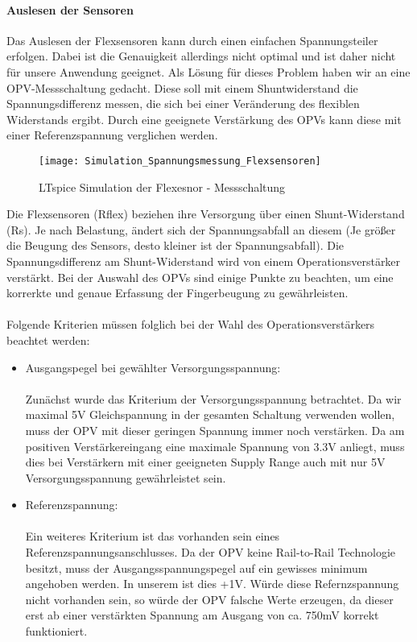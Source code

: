 \documentclass[titlepage,12pt,twoside]{article}
\begin{document}
\paragraph{Auslesen der Sensoren}
\label{par:Auslesen der Sensoren}
\hfill \break
\hfill \break
Das Auslesen der Flexsensoren kann durch einen einfachen Spannungsteiler erfolgen. Dabei ist die Genauigkeit
allerdings nicht optimal und ist daher nicht für unsere Anwendung geeignet. Als Lösung für dieses Problem haben wir an eine 
OPV-Messschaltung gedacht. Diese soll mit einem Shuntwiderstand die Spannungsdifferenz messen, die sich bei einer Veränderung 
des flexiblen Widerstands ergibt. Durch eine geeignete Verstärkung des OPVs kann diese mit einer Referenzspannung verglichen 
werden. \\
\begin{figure}[H]
	\begin{center}
		\scalebox{1.25}
		{\texttt{[image: Simulation\_Spannungsmessung\_Flexsensoren]}}
		\caption{LTspice Simulation der Flexesnor - Messschaltung}
		\label{fig:Simulation_Spannungsmessung_Flexsensoren}		
	\end{center}
\end{figure}
\hfill \break
Die Flexsensoren (Rflex) beziehen ihre Versorgung über einen Shunt-Widerstand (Rs). Je nach Belastung, ändert sich der 
Spannungsabfall an diesem (Je größer die Beugung des Sensors, desto kleiner ist der Spannungsabfall). Die Spannungsdifferenz 
am Shunt-Widerstand wird von einem Operationsverstärker verstärkt. Bei der Auswahl des OPVs sind einige Punkte zu beachten, um 
eine korrerkte und genaue Erfassung der Fingerbeugung zu gewährleisten. \\
\\
Folgende Kriterien müssen folglich bei der Wahl des Operationsverstärkers beachtet werden:
\begin{itemize}
	\item Ausgangspegel bei gewählter Versorgungsspannung: \\
		  \\
		  Zunächst wurde das Kriterium der Versorgungsspannung betrachtet. Da wir maximal 5V Gleichspannung in der gesamten 
		  Schaltung verwenden wollen, muss der OPV mit dieser geringen Spannung immer noch verstärken. Da am positiven 
		  Verstärkereingang eine maximale Spannung von 3.3V anliegt, muss dies bei Verstärkern mit einer geeigneten Supply Range 
		  auch mit nur 5V Versorgungsspannung gewährleistet sein.
	\item Referenzspannung: \\
		  \\
		  Ein weiteres Kriterium ist das vorhanden sein eines Referenzspannungsanschlusses. Da der OPV keine Rail-to-Rail 
		  Technologie besitzt, muss der Ausgangsspannungspegel auf ein gewisses minimum angehoben werden. In unserem ist dies 
		  +1V. Würde diese Refernzspannung nicht vorhanden sein, so würde der OPV falsche Werte erzeugen, da dieser erst ab einer
		  verstärkten Spannung am Ausgang von ca. 750mV korrekt funktioniert.

\end{itemize}
\end{document}

